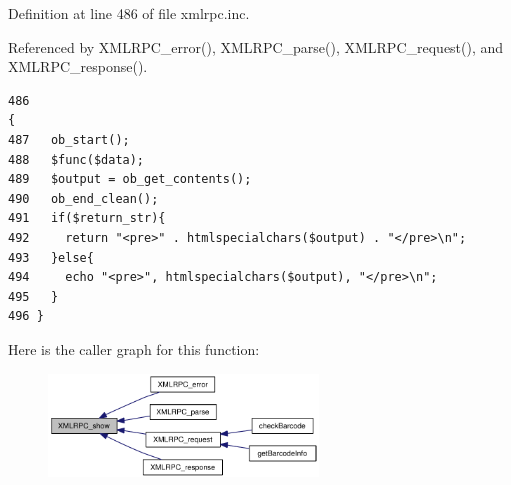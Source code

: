 Definition at line 486 of file xmlrpc.inc.

Referenced by XMLRPC\_\-error(), XMLRPC\_\-parse(), XMLRPC\_\-request(), and XMLRPC\_\-response().

\begin{Code}\begin{verbatim}486                                                                    {
487   ob_start();
488   $func($data);
489   $output = ob_get_contents();
490   ob_end_clean();
491   if($return_str){
492     return "<pre>" . htmlspecialchars($output) . "</pre>\n";
493   }else{
494     echo "<pre>", htmlspecialchars($output), "</pre>\n";
495   }
496 }
\end{verbatim}
\end{Code}




Here is the caller graph for this function:\nopagebreak
\begin{figure}[H]
\begin{center}
\leavevmode
\includegraphics[width=203pt]{xmlrpc_8inc_1f60d2672bcb35f5ff908f64931f8d48_icgraph}
\end{center}
\end{figure}
